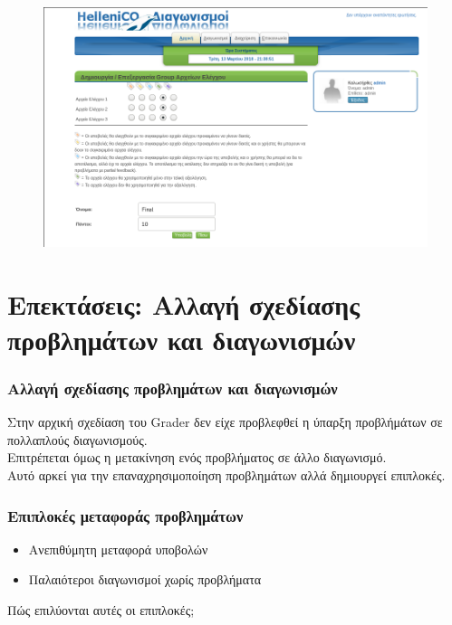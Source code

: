 \documentclass{beamer}
\begin{document}
\begin{frame}
  \frametitle{}
  \begin{figure}

    \includegraphics[scale=0.4,trim=4 4 4 4,clip]{../Figures/groupedit.png}
  \end{figure}
\end{frame}

\section{Επεκτάσεις: Αλλαγή σχεδίασης προβλημάτων και διαγωνισμών}
\begin{frame}
  \frametitle{Αλλαγή σχεδίασης προβλημάτων και διαγωνισμών}

  Στην αρχική σχεδίαση του Grader δεν είχε προβλεφθεί η ύπαρξη προβλήμάτων
  σε πολλαπλούς διαγωνισμούς. \\[0.3cm]

  Επιτρέπεται όμως η μετακίνηση ενός προβλήματος σε άλλο διαγωνισμό. \\[0.3cm]

  Αυτό αρκεί για την επαναχρησιμοποίηση προβλημάτων αλλά δημιουργεί επιπλοκές.

\end{frame}

\begin{frame}
  \frametitle{Επιπλοκές μεταφοράς προβλημάτων}
  
  \begin{itemize}
      \item Ανεπιθύμητη μεταφορά υποβολών
      \item Παλαιότεροι διαγωνισμοί χωρίς προβλήματα
  \end{itemize}%

  \bigskip

  Πώς επιλύονται αυτές οι επιπλοκές;
\end{frame}
\end{document}
